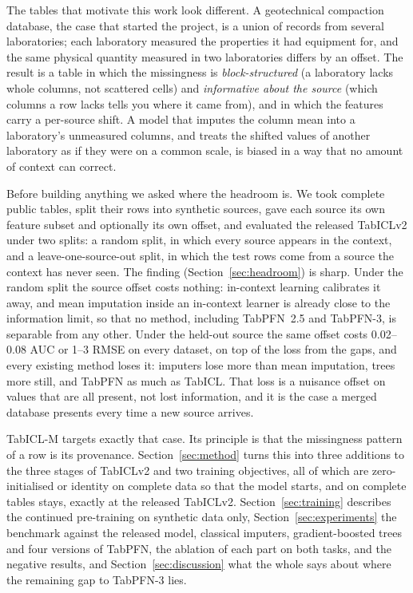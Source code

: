 \documentclass[11pt]{article}
\begin{document}
The tables that motivate this work look different. A geotechnical compaction database,
the case that started the project, is a union of records from several laboratories;
each laboratory measured the properties it had equipment for, and the same physical
quantity measured in two laboratories differs by an offset. The result is a table in
which the missingness is \emph{block-structured} (a laboratory lacks whole columns, not
scattered cells) and \emph{informative about the source} (which columns a row lacks
tells you where it came from), and in which the features carry a per-source shift. A
model that imputes the column mean into a laboratory's unmeasured columns, and treats
the shifted values of another laboratory as if they were on a common scale, is biased
in a way that no amount of context can correct.

Before building anything we asked where the headroom is. We took complete public
tables, split their rows into synthetic sources, gave each source its own feature
subset and optionally its own offset, and evaluated the released TabICLv2 under two
splits: a random split, in which every source appears in the context, and a
leave-one-source-out split, in which the test rows come from a source the context has
never seen. The finding (Section~\ref{sec:headroom}) is sharp. Under the random split
the source offset costs nothing: in-context learning calibrates it away, and mean
imputation inside an in-context learner is already close to the information limit, so
that no method, including TabPFN~2.5 and TabPFN-3, is separable from any other. Under
the held-out source the same offset costs 0.02--0.08 AUC or 1--3 RMSE on every
dataset, on top of the loss from the gaps, and every existing method loses it:
imputers lose more than mean imputation, trees more still, and TabPFN as much as
TabICL. That loss is a nuisance offset on values that are all present, not lost
information, and it is the case a merged database presents every time a new source
arrives.

TabICL-M targets exactly that case. Its principle is that the missingness pattern of a
row is its provenance. Section~\ref{sec:method} turns this into three additions to the
three stages of TabICLv2 and two training objectives, all of which are
zero-initialised or identity on complete data so that the model starts, and on complete
tables stays, exactly at the released TabICLv2. Section~\ref{sec:training} describes the
continued pre-training on synthetic data only, Section~\ref{sec:experiments} the
benchmark against the released model, classical imputers, gradient-boosted trees and
four versions of TabPFN, the ablation of each part on both tasks, and the negative
results, and Section~\ref{sec:discussion} what the whole says about where the
remaining gap to TabPFN-3 lies.
\end{document}
